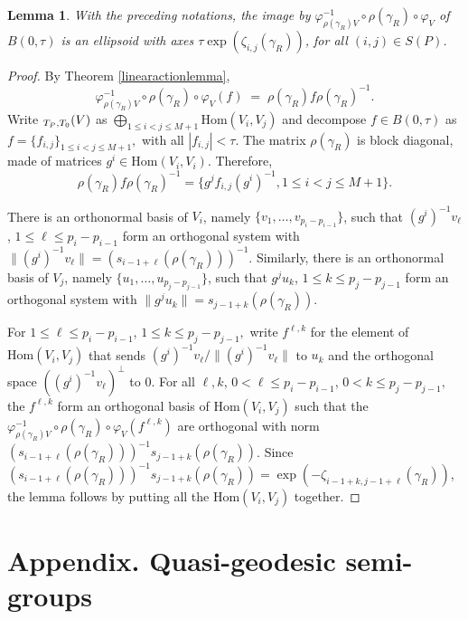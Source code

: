 \documentclass[JEP,XML,SOM,Unicode,NoEqCountersInSection,published]{cedram}
\newcommand{\NoChangel}[1]{%
\expandafter\let\csname old\string#1\endcsname=#1
\let#1=\relax
\newcommand{#1}{\mathop{\mathcode`l="716C\csname old\string#1\endcsname\mathcode`l="7160}\displaylimits}%
}
\newtheorem{lemma}[theorem]{Lemma}
\let\g\gamma
\DeclareMathOperator{\nil}{Nil}\NoChangel{\nil}
\begin{document}
\begin{lemma} With the preceding notations, the image by \hbox{\(\varphi_{\rho(\g_R)V}^{-1}\circ \rho(\g_R) \circ \varphi_V \)} of \(B(0, \tau) \) is an ellipsoid with axes
\(\tau \exp (\zeta_{i, j }(\g_R))\), for all \((i,j) \in S(P)\). \end{lemma}
\begin{proof} By Theorem \ref{linearactionlemma},
\[
 \varphi_{\rho(\g_R) V}^{-1}\circ \rho(\g_R) \circ \varphi_V (f) \; = \; \rho(\g_R) f \rho(\g_R)^{-1}.
\]
Write \(\nil_{T_P,T_0}(V)\) as \(\bigoplus_{1\le i<j \le M+1} \text{Hom}(V_i,V_j)\) and decompose \(f \in B(0, \tau) \) as \(f = \{ f_{i, j } \}_{1\le i<j \le M+1}, \) with all \(|f_{i,j} |< \tau\). The matrix \(\rho(\g_R) \) is block diagonal, made of matrices \(g^i \in \text{Hom}(V_i,V_i)\). Therefore,
\[
 \rho(\g_R) f \rho(\g_R)^{-1} = \{ g^jf_{i,j} (g^i)^{-1}, 1\le i<j \le M+1\}.
\]

There is an orthonormal basis of \(V_i\), namely \(\{v_1, \ldots, v_{p_i - p_{i-1}}\}\), such that \((g^i)^{-1}v_\ell\), \(1\le \ell \le p_i -p_{i-1}\) form an orthogonal system with \(\| (g^i)^{-1} v_\ell \| = (s_{i-1+\ell}(\rho (\g_R)))^{-1} \). Similarly, there is an orthonormal basis of \(V_j\), namely \(\{u_1, \ldots, u_{p_j - p_{j-1}}\}\), such that \(g^j u_k\), \(1 \le k \le p_j -p_{j-1}\) form an orthogonal system with \(\| g^j u_k \| = s_{j-1+k} (\rho (\g_R)) \).

For \(1\leq \ell \leq p_i - p_{i-1}\), \(1\leq k \leq p_j -p_{j-1}, \) write \(f^{ \ell,k } \) for the element of \(\text{Hom}(V_i,V_j)\) that sends \((g^i)^{-1}v_\ell/ \|(g^i)^{-1}v_\ell \| \) to \(u_k \) and the orthogonal space \(((g^i)^{-1}v_\ell)^\perp \) to \(0 \). For all \(\ell, k\), \(0< \ell \le p_i- p_{i-1}\), \(0< k \leq p_j - p_{j-1}, \) the \(f^{\ell,k} \) form an orthogonal basis of \(\text{Hom}(V_i,V_j)\) such that the \(\varphi_{\rho(\g_R)V}^{-1}\circ \rho(\g_R) \circ \varphi_V (f^{\ell, k}) \) are orthogonal with norm \((s_{i-1+\ell}(\rho (\g_R)))^{-1} s_{j-1+k} (\rho (\g_R)) \). Since \((s_{i-1+\ell}(\rho (\g_R)))^{-1} s_{j-1+k} (\rho (\g_R)) = \exp (-\zeta_{i-1+k, j-1+\ell }(\g_R))\), the lemma follows by putting all the \(\text{Hom}(V_i,V_j)\) together. \end{proof}


\appendix
\section*{Appendix. Quasi-geodesic semi-groups}
\end{document}
